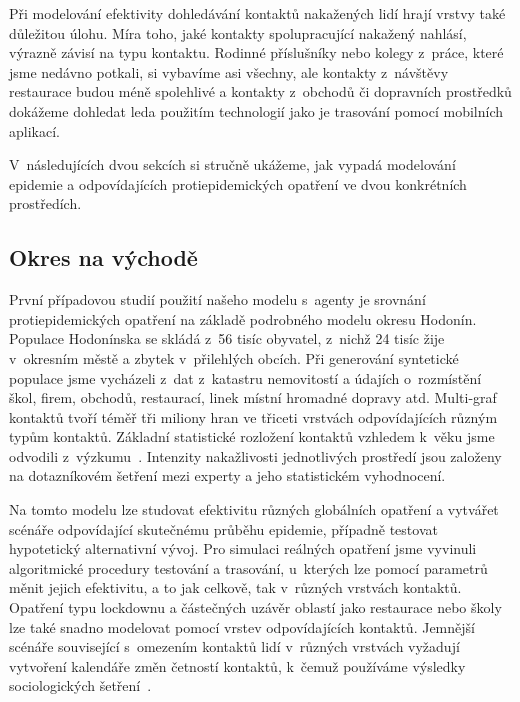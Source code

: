 Při modelování efektivity dohledávání kontaktů nakažených lidí hrají vrstvy také důležitou úlohu. Míra toho, jaké kontakty spolupracující nakažený nahlásí, výrazně závisí na typu kontaktu. Rodinné příslušníky nebo kolegy z~práce, které jsme nedávno potkali, si vybavíme asi všechny, ale kontakty z~návštěvy restaurace budou méně spolehlivé a kontakty z~obchodů či dopravních prostředků dokážeme dohledat leda použitím technologií jako je trasování pomocí mobilních aplikací.

V~následujících dvou sekcích si stručně ukážeme, jak vypadá modelování epidemie a odpovídajících protiepidemických opatření ve dvou konkrétních prostředích. 




\subsection*{Okres na východě}

První případovou studií použití našeho modelu s~agenty je srovnání protiepidemických opatření na základě podrobného modelu okresu Hodonín. Populace Hodonínska se skládá z~56 tisíc obyvatel, z~nichž 24 tisíc žije v~okresním městě a zbytek v~přilehlých obcích. Při generování syntetické populace jsme vycházeli z~dat z~katastru nemovitostí a údajích o~rozmístění škol, firem, obchodů, restaurací, linek místní hromadné dopravy atd. Multi-graf kontaktů tvoří téměř tři miliony hran ve třiceti vrstvách odpovídajících různým typům kontaktů. Základní statistické rozložení kontaktů vzhledem k~věku jsme odvodili z~výzkumu~\cite{Prem_etal2017}. Intenzity nakažlivosti jednotlivých prostředí jsou založeny na dotazníkovém šetření mezi experty a jeho statistickém vyhodnocení. 

Na tomto modelu lze studovat efektivitu různých globálních opatření a vytvářet scénáře odpovídající skutečnému průběhu epidemie, případně testovat hypotetický alternativní vývoj. Pro simulaci reálných opatření jsme vyvinuli algoritmické procedury testování a trasování, u~kterých lze pomocí parametrů měnit jejich efektivitu, a to jak celkově, tak v~různých vrstvách kontaktů. Opatření typu lockdownu a částečných uzávěr oblastí jako restaurace nebo školy lze také snadno modelovat pomocí vrstev odpovídajících kontaktů. Jemnější scénáře související s~omezením kontaktů lidí v~různých vrstvách vyžadují vytvoření kalendáře změn četností kontaktů, k~čemuž používáme výsledky sociologických šetření~\cite{paqcovid}.   

